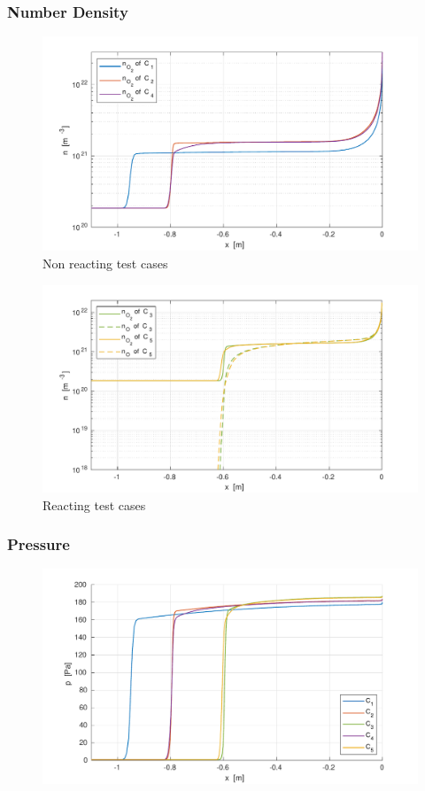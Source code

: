 \documentclass[10pt]{beamer}
\begin{document}
\begin{frame}
  \frametitle{Number Density}
  \begin{figure}[ht]
    \centering
    \includegraphics[width=\textwidth]{stagnationLine/figures/numbDenNReac.pdf}
    \caption{Non reacting test cases}
  \end{figure}
\end{frame}

\begin{frame}
  \begin{figure}[ht]
    \centering
    \includegraphics[width=\textwidth]{stagnationLine/figures/numbDenReac.pdf}
    \caption{Reacting test cases}
  \end{figure}
\end{frame}

\begin{frame}
  \frametitle{Pressure}
  \begin{figure}[ht]
    \centering
    \includegraphics[width=\textwidth]{stagnationLine/figures/pressure.pdf}
  \end{figure}
\end{frame}
\end{document}
